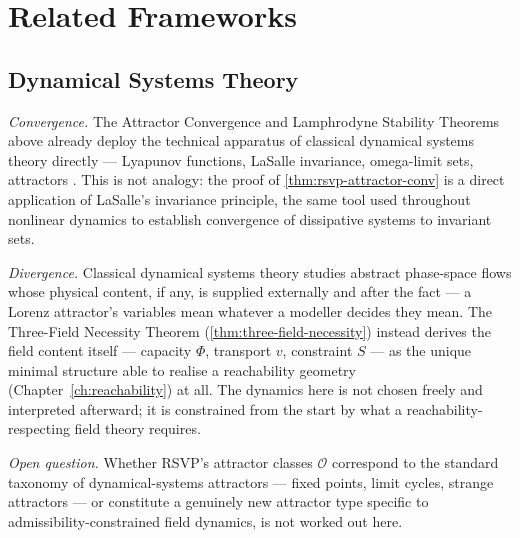 \documentclass[12pt,twoside,openright]{book}
\begin{document}
\section{Related Frameworks}
\label{sec:ch16-related-frameworks}

\subsection*{Dynamical Systems Theory}

\emph{Convergence.} The Attractor Convergence and Lamphrodyne
Stability Theorems above already deploy the technical apparatus
of classical dynamical systems theory directly --- Lyapunov
functions, LaSalle invariance, omega-limit sets, attractors
\parencite{strogatz2015,smale1967}. This is not analogy: the
proof of \cref{thm:rsvp-attractor-conv} is a direct application
of LaSalle's invariance principle, the same tool used throughout
nonlinear dynamics to establish convergence of dissipative
systems to invariant sets.

\emph{Divergence.} Classical dynamical systems theory studies
abstract phase-space flows whose physical content, if any, is
supplied externally and after the fact --- a Lorenz attractor's
variables mean whatever a modeller decides they mean. The
Three-Field Necessity Theorem (\cref{thm:three-field-necessity})
instead derives the field content itself --- capacity $\Phi$,
transport $v$, constraint $S$ --- as the unique minimal
structure able to realise a reachability geometry
(Chapter~\ref{ch:reachability}) at all. The dynamics here is not
chosen freely and interpreted afterward; it is constrained from
the start by what a reachability-respecting field theory
requires.

\emph{Open question.} Whether RSVP's attractor classes
$\mathcal{O}$ correspond to the standard taxonomy of
dynamical-systems attractors --- fixed points, limit cycles,
strange attractors --- or constitute a genuinely new attractor
type specific to admissibility-constrained field dynamics, is
not worked out here.
\end{document}
